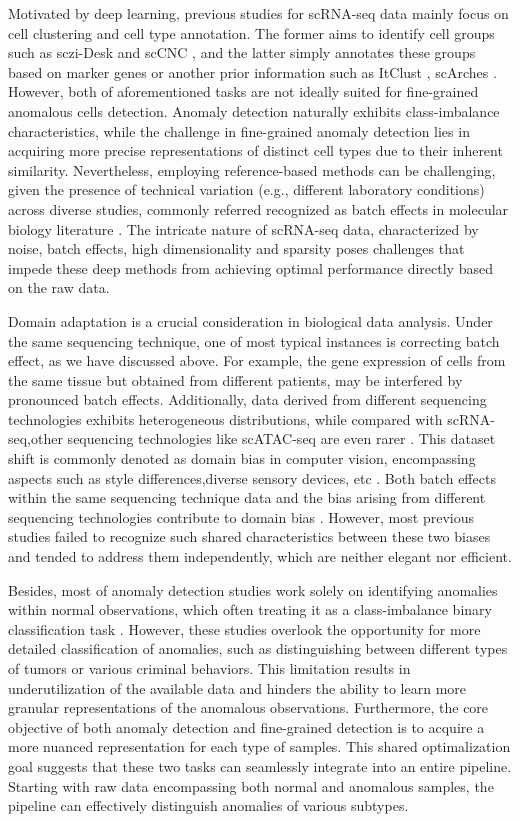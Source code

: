 \documentclass{article}
\begin{document}
Motivated by deep learning, previous studies for scRNA-seq data mainly focus on cell 
clustering and cell type annotation. The former aims to identify cell groups such as sczi-Desk \cite{sczi-Desk} 
and scCNC \cite{scCNC}, and the latter simply annotates these groups based on marker genes or another prior 
information such as ItClust \cite{ItClust}, scArches \cite{scArches}. 
However, both of aforementioned tasks are not ideally suited for fine-grained anomalous cells detection. 
Anomaly detection naturally exhibits class-imbalance characteristics, while the challenge 
in fine-grained anomaly detection lies in acquiring more precise representations of distinct cell types 
due to their inherent similarity. Nevertheless, employing reference-based methods can be challenging, given the presence of 
technical variation (e.g., different laboratory conditions) across diverse studies, 
commonly referred recognized as batch effects in molecular biology literature \cite{Polyphony}. 
The intricate nature of scRNA-seq data, characterized by noise, batch effects, high 
dimensionality and sparsity \cite{dands} poses challenges that impede these deep 
methods from achieving optimal performance directly based on the raw data.

Domain adaptation is a crucial consideration in biological data analysis. Under the same sequencing technique, one of most 
typical instances is correcting batch effect, as we have discussed above. For example, the gene expression of cells from 
the same tissue but obtained from different patients, may be interfered by pronounced batch effects. 
Additionally, data derived from different sequencing technologies exhibits heterogeneous distributions, while 
compared with scRNA-seq,other sequencing technologies like scATAC-seq are even rarer \cite{RNAmore}.
This dataset shift is commonly denoted as domain bias in computer vision, encompassing aspects 
such as style differences,diverse sensory devices, etc \cite{domainada}. Both batch effects within the same sequencing technique data and the bias arising from different 
sequencing technologies contribute to domain bias \cite{ACE}. However, most previous studies failed to 
recognize such shared characteristics between these two biases and tended to address them 
independently, which are neither elegant nor efficient.

Besides, most of anomaly detection studies work solely on identifying anomalies within normal 
observations, which often treating it as a class-imbalance binary classification task \cite{OA}. 
However, these studies overlook the opportunity for more detailed classification of 
anomalies, such as distinguishing between different types of tumors or various criminal 
behaviors. This limitation results in underutilization of the available data and hinders 
the ability to learn more granular representations of the anomalous observations. 
Furthermore, the core objective of both anomaly detection and fine-grained detection is to 
acquire a more nuanced representation for each type of samples. This shared optimalization 
goal suggests that these two tasks can seamlessly integrate into an entire pipeline. 
Starting with raw data encompassing both normal and anomalous samples, the pipeline can 
effectively distinguish anomalies of various subtypes.
\end{document}
